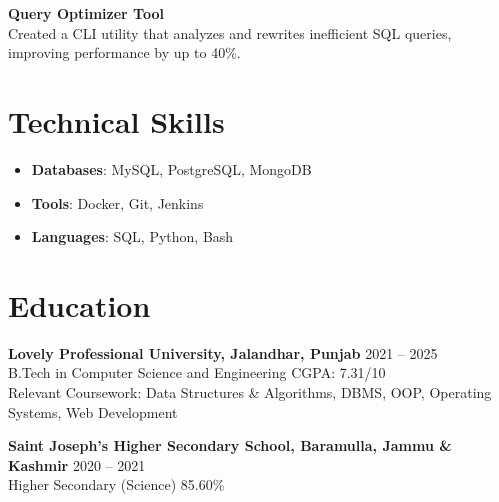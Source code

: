 \documentclass[10pt,a4paper]{article}
\begin{document}
\textbf{Query Optimizer Tool}\\
Created a CLI utility that analyzes and rewrites inefficient SQL queries, improving performance by up to 40\%.

\section*{Technical Skills}
\begin{itemize}
\item \textbf{Databases}: MySQL, PostgreSQL, MongoDB
\item \textbf{Tools}: Docker, Git, Jenkins
\item \textbf{Languages}: SQL, Python, Bash
\end{itemize}

\section*{Education}

\textbf{Lovely Professional University, Jalandhar, Punjab} \hfill 2021 -- 2025\\
B.Tech in Computer Science and Engineering \hfill CGPA: 7.31/10\\
Relevant Coursework: Data Structures \& Algorithms, DBMS, OOP, Operating Systems, Web Development

\vspace{2pt}

\textbf{Saint Joseph's Higher Secondary School, Baramulla, Jammu \& Kashmir} \hfill 2020 -- 2021\\
Higher Secondary (Science) \hfill 85.60\%
\end{document}
